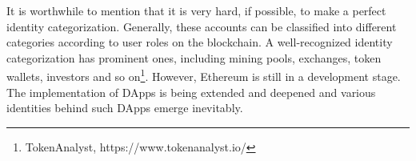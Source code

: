 


It is worthwhile to mention that it is very hard, if possible, to make a perfect identity categorization. Generally, these accounts can be classified into different categories according to user roles on the blockchain. A well-recognized identity categorization has prominent ones, including mining pools, exchanges, token wallets, investors and so on\footnote{TokenAnalyst, https://www.tokenanalyst.io/}.
 However, Ethereum is still in a development stage. The implementation of DApps is being extended and deepened and various identities behind such DApps emerge inevitably.





